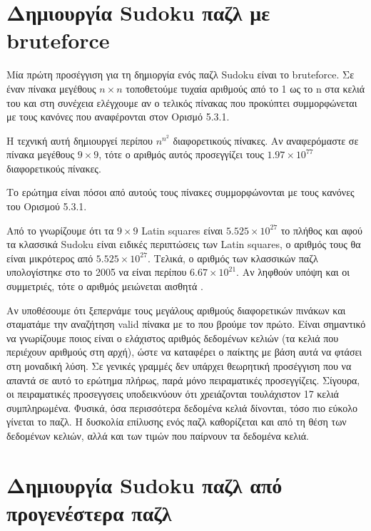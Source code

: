 \documentclass[oneside,12pt]{book}
\theoremstyle{definition}
\begin{document}
\section{Δημιουργία Sudoku παζλ με bruteforce}

Μία πρώτη προσέγγιση για τη δημιοργία ενός παζλ Sudoku είναι το bruteforce. Σε έναν πίνακα μεγέθους \(n \times n\) τοποθετούμε τυχαία αριθμούς από το 1 ως το n στα κελιά του και στη συνέχεια ελέγχουμε αν ο τελικός πίνακας που προκύπτει συμμορφώνεται με τους κανόνες που αναφέρονται στον Ορισμό 5.3.1. \par

Η τεχνική αυτή δημιουργεί περίπου \(n^{n^2}\) διαφορετικούς πίνακες. Αν αναφερόμαστε σε πίνακα μεγέθους \(9 \times 9\), τότε ο αριθμός αυτός προσεγγίζει τους \(1.97\times10^{77}\) διαφορετικούς πίνακες. \par

Το ερώτημα είναι πόσοι από αυτούς τους πίνακες συμμορφώνονται με τους κανόνες του Ορισμού 5.3.1. \par

Από το \cite{6} γνωρίζουμε ότι τα \(9 \times 9\) Latin squares είναι \(5.525\times10^{27}\) το πλήθος και αφού τα κλασσικά Sudoku είναι ειδικές περιπτώσεις των Latin squares, ο αριθμός τους θα είναι μικρότερος από \(5.525\times10^{27}\). Τελικά, ο αριθμός των κλασσικών παζλ υπολογίστηκε στο \cite{7} το 2005 να είναι περίπου \(6.67\times10^{21}\). Αν ληφθούν υπόψη και οι συμμετριές, τότε ο αριθμός μειώνεται αισθητά \cite{8}.

Αν υποθέσουμε ότι ξεπερνάμε τους μεγάλους αριθμούς διαφορετικών πινάκων και σταματάμε την αναζήτηση valid πίνακα με το που βρούμε τον πρώτο. Είναι σημαντικό να γνωρίζουμε ποιος είναι ο ελάχιστος αριθμός δεδομένων κελιών (τα κελιά που περιέχουν αριθμούς στη αρχή), ώστε να καταφέρει ο παίκτης με βάση αυτά να φτάσει στη μοναδική λύση. Σε γενικές γραμμές δεν υπάρχει θεωρητική προσέγγιση που να απαντά σε αυτό το ερώτημα πλήρως, παρά μόνο πειραματικές προσεγγίζεις. Σίγουρα, οι πειραματικές προσεγγσεις υποδεικνύουν ότι χρειάζονται τουλάχιστον 17 κελιά συμπληρωμένα. Φυσικά, όσα περισσότερα δεδομένα κελιά δίνονται, τόσο πιο εύκολο γίνεται το παζλ. Η δυσκολία επίλυσης ενός παζλ καθορίζεται και από τη θέση των δεδομένων κελιών, αλλά και των τιμών που παίρνουν τα δεδομένα κελιά.

\section{Δημιουργία Sudoku παζλ από προγενέστερα παζλ}
\end{document}
